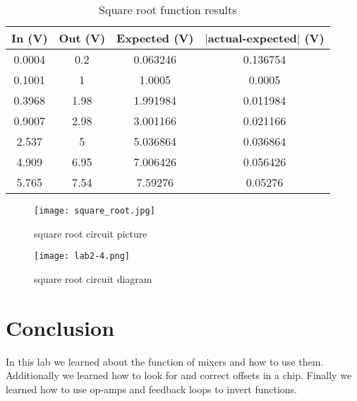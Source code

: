 \documentclass[prl,12pt,notitlepage,aps,onecolumn,superscriptaddress]{revtex4-1}
\begin{document}
\begin{table}[h]
 \centering
 \caption{Square root function results}
   \begin{tabular}{|c|c|c|c|}
   \toprule
   In (V)   & Out (V)  & Expected (V)  & $|$actual-expected$|$ (V) \\
   \midrule
   0.0004 & 0.2   & 0.063246 & 0.136754 \\
   0.1001 & 1     & 1.0005 & 0.0005 \\
   0.3968 & 1.98  & 1.991984 & 0.011984 \\
   0.9007 & 2.98  & 3.001166 & 0.021166 \\
   2.537 & 5     & 5.036864 & 0.036864 \\
   4.909 & 6.95  & 7.006426 & 0.056426 \\
   5.765 & 7.54  & 7.59276 & 0.05276 \\
   \bottomrule
   \end{tabular}%
 \label{tab:addlabel}%
\end{table}%

\begin{figure}[h]
\begin{center}
\texttt{[image: square\_root.jpg]}
\end{center}
\caption{\label{fig:pic} square root circuit picture}
\end{figure}

\begin{figure}[h]
\begin{center}
\texttt{[image: lab2-4.png]}
\end{center}
\caption{\label{fig:pic} square root circuit diagram}
\end{figure}

\section{Conclusion}
In this lab we learned about the function of mixers and how to use them. Additionally we learned how to look for and correct offsets in a chip. Finally we learned how to use op-amps and feedback loops to invert functions.
\end{document}
